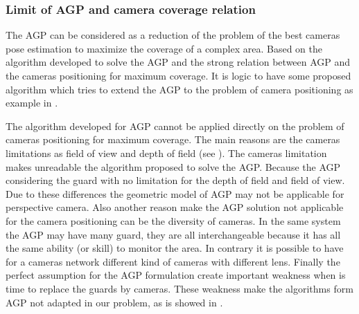 
	
	\subsubsection{Limit of AGP and camera coverage relation}

The AGP can be considered as a reduction of the problem of the best cameras pose estimation to maximize the coverage of a complex area. Based on the algorithm developed to solve the AGP and the strong relation between AGP and the cameras positioning for maximum coverage. It is logic to have some proposed algorithm which tries to extend the AGP to the  problem of camera positioning as example in \cite{221*fleishman2000,33*reddy2012,43*erdem2006}.


The algorithm developed for AGP cannot be applied directly on the problem of cameras positioning for maximum coverage. The main reasons are the cameras limitations as field of view and depth of field (see \cite{82*chrysostomou2012,170*yabuta2008}). The cameras limitation makes  unreadable the algorithm proposed to solve the AGP.
 Because the AGP considering the guard with no limitation for the depth of field and field of view. Due to these differences the geometric model of AGP may not be applicable for perspective camera.
Also another reason make the AGP solution not applicable for the camera positioning can be the diversity of cameras. In the same system the AGP may have many guard, they are all interchangeable because it has all the same ability (or skill) to monitor the area. In contrary it is possible to have for a cameras network different kind of cameras with different lens. 
Finally the  perfect assumption for the AGP formulation create important weakness when is time to replace the guards by cameras. These weakness make the algorithms form AGP not adapted in our problem, as is showed in \cite{81*nikolaidis2009,171*horster2006}.

